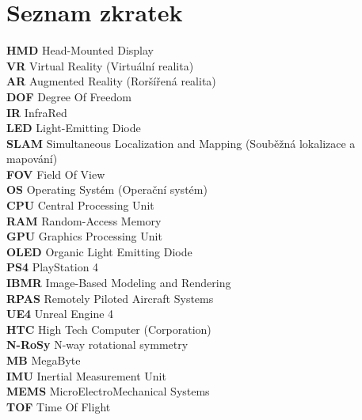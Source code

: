 \documentclass[a4paper, 12pt]{report}
\begin{document}
\pagestyle{plain}     %
\setcounter{page}{1}  %
\tableofcontents
\thispagestyle{plain}

\chapter*{Seznam zkratek}
\textbf{HMD} Head-Mounted Display\\
\textbf{VR} Virtual Reality (Virtuální realita)\\
\textbf{AR} Augmented Reality (Roršířená realita)\\
\textbf{DOF} Degree Of Freedom\\
\textbf{IR} InfraRed\\
\textbf{LED} Light-Emitting Diode\\
\textbf{SLAM} Simultaneous Localization and Mapping (Souběžná lokalizace a mapování)\\
\textbf{FOV} Field Of View\\
\textbf{OS} Operating Systém (Operační systém)\\
\textbf{CPU} Central Processing Unit\\
\textbf{RAM} Random-Access Memory\\
\textbf{GPU} Graphics Processing Unit\\
\textbf{OLED} Organic Light Emitting Diode\\
\textbf{PS4} PlayStation 4\\
\textbf{IBMR} Image-Based Modeling and Rendering\\
\textbf{RPAS} Remotely Piloted Aircraft Systems\\
\textbf{UE4} Unreal Engine 4\\
\textbf{HTC} High Tech Computer (Corporation)\\
\textbf{N-RoSy} N-way rotational symmetry\\
\textbf{MB} MegaByte\\
\textbf{IMU} Inertial Measurement Unit\\
\textbf{MEMS} MicroElectroMechanical Systems\\
\textbf{TOF} Time Of Flight\\

\listoffigures

\newpage
\end{document}
